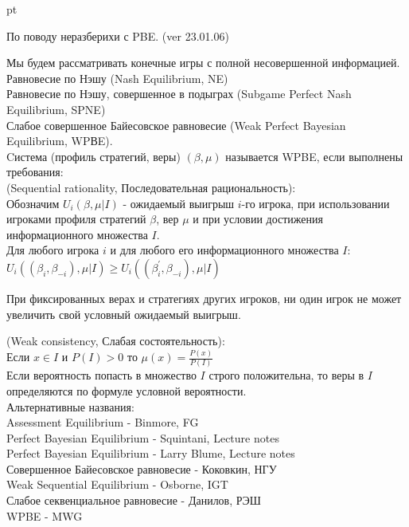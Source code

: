 \documentclass[pdftex,12pt,a4paper]{article}
\begin{document}
 pt

По поводу неразберихи с PBE. (ver 23.01.06)

Мы будем рассматривать конечные игры с полной несовершенной
информацией. \\

Равновесие по Нэшу (Nash Equilibrium, NE) \\

Равновесие по Нэшу, совершенное в подыграх (Subgame Perfect Nash
Equilibrium, SPNE) \\

Слабое совершенное Байесовское равновесие (Weak Perfect Bayesian
Equilibrium, WPВE).  \\
Cистема (профиль стратегий, веры) $(\beta, \mu)$ называется WPBE,
если выполнены
требования: \\
(Sequential rationality, Последовательная рациональность): \\
Обозначим $U_{i}(\beta,\mu|I)$ - ожидаемый выигрыш $i$-го игрока,
при использовании игроками профиля стратегий $\beta$, вер $\mu$ и
при условии достижения информационного множества $I$. \\
Для любого игрока $i$ и для любого его информационного множества $I$: \\
$U_{i}((\beta_{i},\beta_{-i}),\mu|I)\geq
U_{i}((\beta_{i}^{'},\beta_{-i}),\mu|I)$

При фиксированных верах и стратегиях других игроков, ни один игрок
не может увеличить свой условный ожидаемый выигрыш.




(Weak consistency, Слабая состоятельность):  \\
Если $x \in I$ и $P(I)>0$ то $\mu(x)=\frac{P(x)}{P(I)}$ \\
Если вероятность попасть в множество $I$ строго положительна, то
веры в $I$ определяются по формуле условной вероятности. \\


Альтернативные названия: \\

Assessment Equilibrium - Binmore, FG \\
Perfect Bayesian Equilibrium - Squintani, Lecture notes \\
Perfect Bayesian Equilibrium - Larry Blume, Lecture notes \\
Совершенное Байесовское равновесие - Коковкин, НГУ \\
Weak Sequential Equilibrium - Osborne, IGT \\
Слабое секвенциальное равновесие - Данилов, РЭШ \\
WPBE - MWG \\
\end{document}
